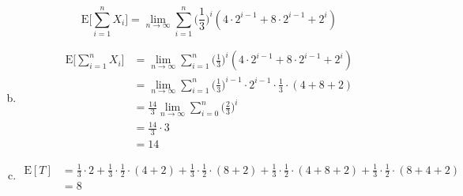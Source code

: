 \documentclass{article}
\begin{document}
\begin{enumerate}[(a)]
            \begin{equation*}
                \text{E}\bigg[\sum_{i=1}^nX_i\bigg] =\lim_{n\rightarrow\infty}\sum_{i=1}^n\bigg(\frac{1}{3}\bigg)^i(4\cdot2^{i-1}+8\cdot2^{i-1}+2^i)
            \end{equation*}
        \item 
            \begin{equation*}
                \begin{split}
                    \text{E}\bigg[\sum_{i=1}^nX_i\bigg] &=\lim_{n\rightarrow\infty}\sum_{i=1}^n\bigg(\frac{1}{3}\bigg)^i(4\cdot2^{i-1}+8\cdot2^{i-1}+2^i)\\
                    &=\lim_{n\rightarrow\infty}\sum_{i=1}^n\bigg(\frac{1}{3}\bigg)^{i-1}\cdot2^{i-1}\cdot\frac{1}{3}\cdot(4+8+2)\\
                    &=\frac{14}{3}\lim_{n\rightarrow\infty}\sum_{i=0}^n\bigg(\frac{2}{3}\bigg)^{i}\\
                    &=\frac{14}{3}\cdot3\\
                    &=14
                \end{split}
            \end{equation*}
        \item
            \begin{equation*}
                \begin{split}
                    \text{E}[T]&=\frac{1}{3}\cdot2+\frac{1}{3}\cdot\frac{1}{2}\cdot(4+2)+\frac{1}{3}\cdot\frac{1}{2}\cdot(8+2)+\frac{1}{3}\cdot\frac{1}{2}\cdot(4+8+2)+\frac{1}{3}\cdot\frac{1}{2}\cdot(8+4+2)\\
                    &=8
                \end{split}
            \end{equation*}
    \end{enumerate}  
\end{document}
